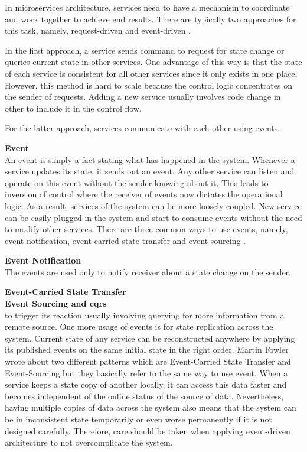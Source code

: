 In microservices architecture, services need to have a mechanism to coordinate and work together to achieve end results. There are typically two approaches for this task, namely, request-driven and event-driven \cite{stopford2018designingeventdriven}.

In the first approach, a service sends command to request for state change or queries current state in other services. One advantage of this way is that the state of each service is consistent for all other services since it only exists in one place. However, this method is hard to scale because the control logic concentrates on the sender of requests. Adding a new service usually involves code change in other to include it in the control flow. 

For the latter approach, services communicate with each other using events.

\textbf{Event}\\
An event is simply a fact stating what has happened in the system. Whenever a service updates its state, it sends out an event. Any other service can listen and operate on this event without the sender knowing about it. This leads to inversion of control where the receiver of events now dictates the operational logic. As a result, services of the system can be more loosely coupled. New service can be easily plugged in the system and start to consume events without the need to modify other services. There are three common ways to use events, namely, event notification, event-carried state transfer and event sourcing \cite{martinfowlereventdriven}.

\textbf{Event Notification}\\
The events are used only to notify receiver about a state change on the sender. 

\textbf{Event-Carried State Transfer}\\

\textbf{Event Sourcing and \acrfull{cqrs}}\\
 

  to trigger its reaction usually involving querying for more information from a remote source. One more usage of events is for state replication across the system. Current state of any service can be reconstructed anywhere by applying its published events on the same initial state in the right order. Martin Fowler wrote about two different patterns which are Event-Carried State Transfer and Event-Sourcing \cite{martinfowlereventdriven} but they basically refer to the same way to use event. When a service keeps a state copy of another locally, it can access this data faster and becomes independent of the online status of the source of data. Nevertheless, having multiple copies of data across the system also means that the system can be in inconsistent state temporarily or even worse permanently if it is not designed carefully. Therefore, care should be taken when applying event-driven architecture to not overcomplicate the system.

